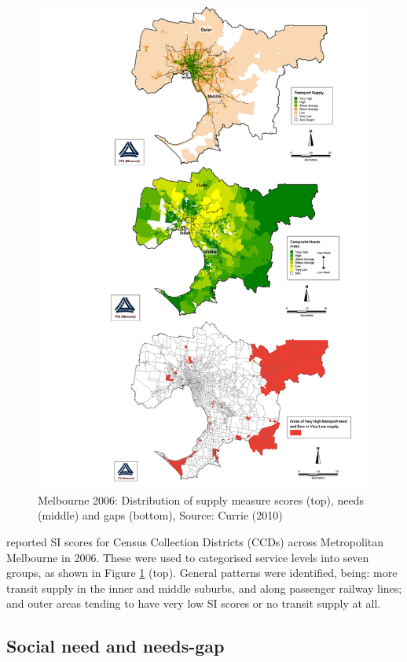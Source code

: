 \documentclass[preprint, 3p,
authoryear]{elsarticle} %
\begin{document}
\begin{figure}
\includegraphics[width=0.9\linewidth]{graphics/Currie2010combined1} \caption{Melbourne 2006: Distribution of supply measure scores (top), needs (middle) and gaps (bottom), Source: Currie (2010)}\label{fig:Currie_map_SI}
\end{figure}

\citet{currie2010identifying} reported SI scores for Census Collection
Districts (CCDs) across Metropolitan Melbourne in 2006. These were used
to categorised service levels into seven groups, as shown in Figure
\ref{fig:Currie_map_SI} (top). General patterns were identified, being:
more transit supply in the inner and middle suburbs, and along passenger
railway lines; and outer areas tending to have very low SI scores or no
transit supply at all.

\subsection{Social need and needs-gap}\label{social-need-and-needs-gap}
\end{document}
